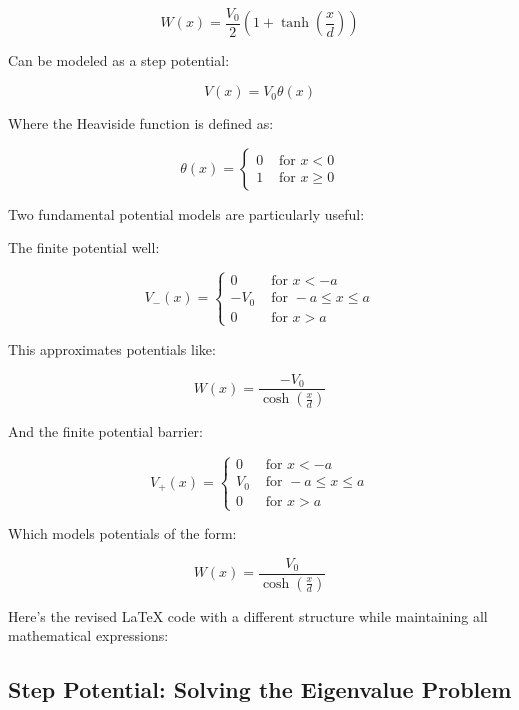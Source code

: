 \documentclass[italian]{HKNdocument}
\begin{document}
\begin{equation}
W(x)=\frac{V_{0}}{2}\left(1+\tanh \left(\frac{x}{d}\right)\right)
\end{equation}

Can be modeled as a step potential:

\begin{equation}
V(x)=V_{0} \theta(x)
\end{equation}

Where the Heaviside function is defined as:

\[
\theta(x)= \begin{cases}0 & \text { for } x<0  \\ 1 & \text { for } x \geq 0\end{cases}
\]

Two fundamental potential models are particularly useful:

The finite potential well:

\[
V_{-}(x)= \begin{cases}0 & \text { for } x<-a  \\ -V_{0} & \text { for }-a \leq x \leq a \\ 0 & \text { for } x>a\end{cases}
\]

This approximates potentials like:

\begin{equation}
W(x)=\frac{-V_{0}}{\cosh \left(\frac{x}{d}\right)}
\end{equation}

And the finite potential barrier:

\[
V_{+}(x)= \begin{cases}0 & \text { for } x<-a  \\ V_{0} & \text { for }-a \leq x \leq a \\ 0 & \text { for } x>a\end{cases}
\]

Which models potentials of the form:

\begin{equation}
W(x)=\frac{V_{0}}{\cosh \left(\frac{x}{d}\right)}
\end{equation}

Here's the revised LaTeX code with a different structure while maintaining all mathematical expressions:


\subsection{Step Potential: Solving the Eigenvalue Problem}
\end{document}

